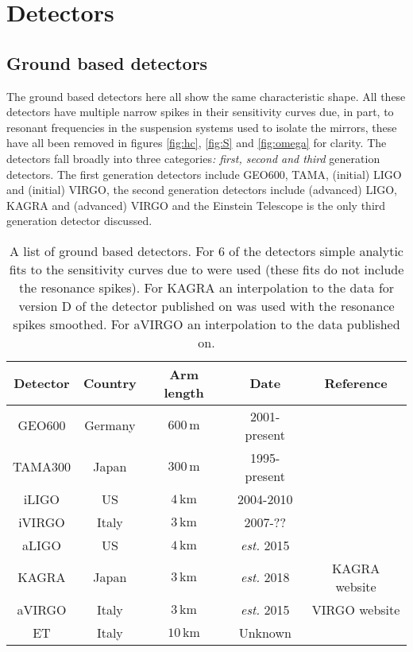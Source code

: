 \newpage\section{Detectors}\label{sec:detectors}

\subsection{Ground based detectors}
The ground based detectors here all show the same characteristic shape. All these detectors have multiple narrow spikes in their sensitivity curves due, in part, to resonant frequencies in the suspension  systems used to isolate the mirrors, these have all been removed in figures \ref{fig:hc}, \ref{fig:S} and \ref{fig:omega} for clarity. The detectors fall broadly into three categories\emph{: first, second and third} generation detectors. The first generation detectors include GEO600, TAMA, (initial) LIGO and (initial) VIRGO, the second generation detectors include (advanced) LIGO, KAGRA and (advanced) VIRGO and the Einstein Telescope is the only third generation detector discussed.

\begin{table}[h!]
\label{table:1}
\centering
\begin{tabular}{ c c c c c }
\hline
{\bf Detector} & {\bf Country} & {\bf Arm length} & {\bf Date} & {\bf Reference} \\
\hline
  GEO600 	& Germany 	& $600\,\textrm{m}$ 	& 2001-present			& \citet{Sathyaprakash} \\
  TAMA300 	& Japan		& $300\,\textrm{m}$ 	& 1995-present			& \citet{Sathyaprakash} \\
  iLIGO 	& US 		& $4\,\textrm{km}$ 	& 2004-2010 			& \citet{Sathyaprakash} \\
  iVIRGO		& Italy		& $3\,\textrm{km}$ 	& 2007-??			& \citet{Sathyaprakash} \\
  aLIGO 	& US		& $4\,\textrm{km}$ 	& \emph{est.} 2015	 	& \citet{Sathyaprakash} \\
  KAGRA 	& Japan 	& $3\,\textrm{km}$ 	& \emph{est.} 2018	 	& KAGRA website \\
  aVIRGO	& Italy 	& $3\,\textrm{km}$ 	& \emph{est.} 2015	 	& VIRGO website \\
  ET 		& Italy		& $10\,\textrm{km}$ 	& Unknown 			& \citet{Sathyaprakash} \\
\hline
\end{tabular}
\caption{A list of ground based detectors. For 6 of the detectors simple analytic fits to the sensitivity curves due to \citet{Sathyaprakash} were used (these fits do not include the resonance spikes). For KAGRA an interpolation to the data for version D of the detector published on \citet{KAGRAwebsite} was used with the resonance spikes smoothed. For aVIRGO an interpolation to the data published on.}
\end{table}




